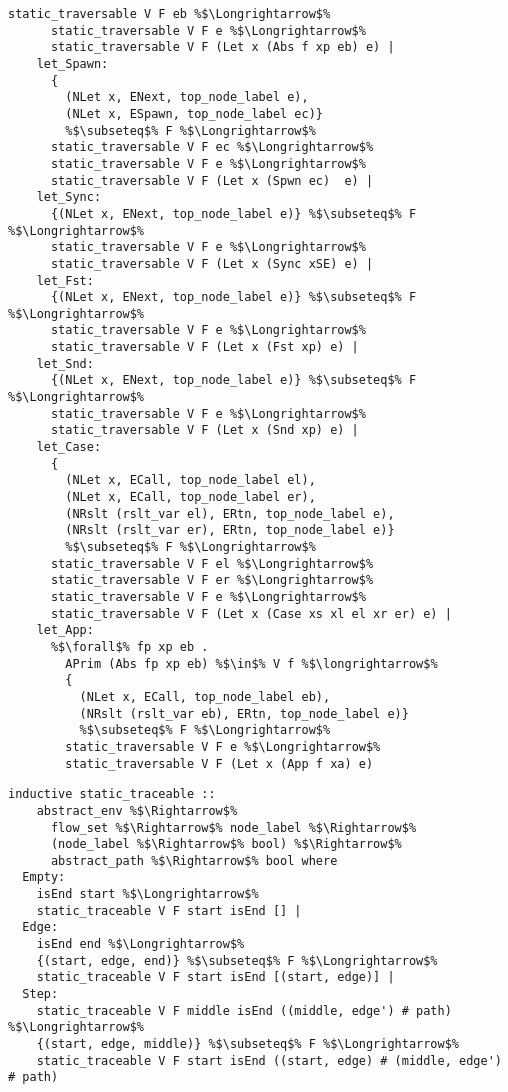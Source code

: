 \documentclass{article}
\begin{document}
\begin{lstlisting}[style=codestyle1, escapechar=\%]
      static_traversable V F eb %$\Longrightarrow$%
      static_traversable V F e %$\Longrightarrow$%
      static_traversable V F (Let x (Abs f xp eb) e) |
    let_Spawn:
      {
        (NLet x, ENext, top_node_label e),
        (NLet x, ESpawn, top_node_label ec)}
        %$\subseteq$% F %$\Longrightarrow$%
      static_traversable V F ec %$\Longrightarrow$%
      static_traversable V F e %$\Longrightarrow$%
      static_traversable V F (Let x (Spwn ec)  e) |
    let_Sync:
      {(NLet x, ENext, top_node_label e)} %$\subseteq$% F %$\Longrightarrow$%
      static_traversable V F e %$\Longrightarrow$%
      static_traversable V F (Let x (Sync xSE) e) |
    let_Fst:
      {(NLet x, ENext, top_node_label e)} %$\subseteq$% F %$\Longrightarrow$%
      static_traversable V F e %$\Longrightarrow$%
      static_traversable V F (Let x (Fst xp) e) |
    let_Snd:
      {(NLet x, ENext, top_node_label e)} %$\subseteq$% F %$\Longrightarrow$%
      static_traversable V F e %$\Longrightarrow$%
      static_traversable V F (Let x (Snd xp) e) |
    let_Case:
      {
        (NLet x, ECall, top_node_label el),
        (NLet x, ECall, top_node_label er),
        (NRslt (rslt_var el), ERtn, top_node_label e),
        (NRslt (rslt_var er), ERtn, top_node_label e)}
        %$\subseteq$% F %$\Longrightarrow$%
      static_traversable V F el %$\Longrightarrow$%
      static_traversable V F er %$\Longrightarrow$%
      static_traversable V F e %$\Longrightarrow$%
      static_traversable V F (Let x (Case xs xl el xr er) e) |
    let_App:
      %$\forall$% fp xp eb .
        APrim (Abs fp xp eb) %$\in$% V f %$\longrightarrow$%
        {
          (NLet x, ECall, top_node_label eb),
          (NRslt (rslt_var eb), ERtn, top_node_label e)}
          %$\subseteq$% F %$\Longrightarrow$%
        static_traversable V F e %$\Longrightarrow$%
        static_traversable V F (Let x (App f xa) e)

  \end{lstlisting}

\begin{lstlisting}[style=codestyle1, escapechar=\%]
  inductive static_traceable ::
    abstract_env %$\Rightarrow$%
      flow_set %$\Rightarrow$% node_label %$\Rightarrow$%
      (node_label %$\Rightarrow$% bool) %$\Rightarrow$%
      abstract_path %$\Rightarrow$% bool where
  Empty:
    isEnd start %$\Longrightarrow$%
    static_traceable V F start isEnd [] |
  Edge:
    isEnd end %$\Longrightarrow$%
    {(start, edge, end)} %$\subseteq$% F %$\Longrightarrow$%
    static_traceable V F start isEnd [(start, edge)] |
  Step:
    static_traceable V F middle isEnd ((middle, edge') # path) %$\Longrightarrow$%
    {(start, edge, middle)} %$\subseteq$% F %$\Longrightarrow$%
    static_traceable V F start isEnd ((start, edge) # (middle, edge') # path)
  \end{lstlisting}
\end{document}

